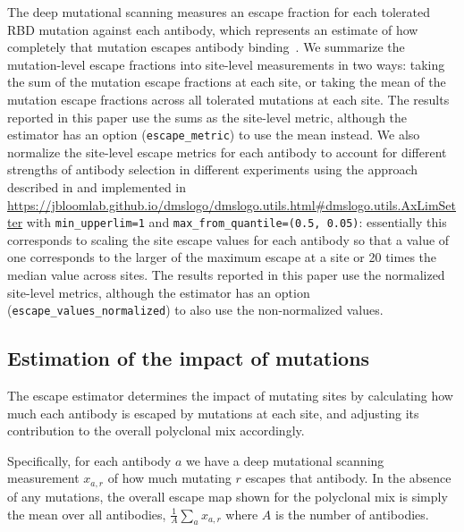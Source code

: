 \documentclass[9pt,twocolumn,twoside]{gsajnl_modified}
\begin{document}
{The deep mutational scanning measures an escape fraction for each tolerated RBD mutation against each antibody, which represents an estimate of how completely that mutation escapes antibody binding~\citep{greaney2021complete}.
We summarize the mutation-level escape fractions into site-level measurements in two ways: taking the sum of the mutation escape fractions at each site, or taking the mean of the mutation escape fractions across all tolerated mutations at each site.
The results reported in this paper use the sums as the site-level metric, although the estimator has an option (\texttt{escape\_metric}) to use the mean instead.
We also normalize the site-level escape metrics for each antibody to account for different strengths of antibody selection in different experiments using the approach described in \citet{greaney2021comprehensive} and implemented in \url{https://jbloomlab.github.io/dmslogo/dmslogo.utils.html#dmslogo.utils.AxLimSetter} with \texttt{min\_upperlim=1} and \texttt{max\_from\_quantile=(0.5, 0.05)}: essentially this corresponds to scaling the site escape values for each antibody so that a value of one corresponds to the larger of the maximum escape at a site or 20 times the median value across sites.
The results reported in this paper use the normalized site-level metrics, although the estimator has an option (\texttt{escape\_values\_normalized}) to also use the non-normalized values.

\subsection{Estimation of the impact of mutations}
The escape estimator determines the impact of mutating sites by calculating how much each antibody is escaped by mutations at each site, and adjusting its contribution to the overall polyclonal mix accordingly.

Specifically, for each antibody $a$ we have a deep mutational scanning measurement $x_{a,r}$ of how much mutating $r$ escapes that antibody.
In the absence of any mutations, the overall escape map shown for the polyclonal mix is simply the mean over all antibodies, $\frac{1}{A}\sum_a x_{a,r}$ where $A$ is the number of antibodies.

}
\end{document}
